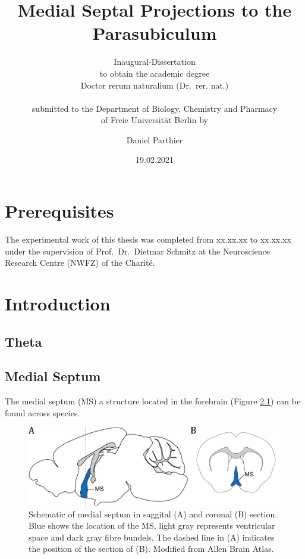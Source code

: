 \documentclass[
  12pt,
]{book}
\title{Medial Septal Projections to the Parasubiculum}
\subtitle{Inaugural-Dissertation\\
to obtain the academic degree\\
Doctor rerum naturalium (Dr.~rer. nat.)\\
~\\
submitted to the Department of Biology, Chemistry and Pharmacy\\
of Freie Universität Berlin by}
\author{Daniel Parthier}
\date{19.02.2021}
\begin{document}
\maketitle

{
\setcounter{tocdepth}{1}
\tableofcontents
}
\hypertarget{prerequisites}{%
\chapter{Prerequisites}\label{prerequisites}}

The experimental work of this thesis was completed from xx.xx.xx to xx.xx.xx under the supervision of Prof.~Dr.~Dietmar Schmitz at the Neuroscience Research Centre (NWFZ) of the Charité.

\hypertarget{intro}{%
\chapter{Introduction}\label{intro}}

\hypertarget{theta}{%
\section{Theta}\label{theta}}

\hypertarget{medial-septum}{%
\section{Medial Septum}\label{medial-septum}}

The medial septum (MS) a structure located in the forebrain (Figure \ref{fig:MS-Scheme}) can be found across species.

\begin{figure}[H]

{\centering \includegraphics{Figures/Schemes/MS_schematic} 

}

\caption{Schematic of medial septum in saggital (A) and coronal (B) section. Blue shows the location of the MS, light gray represents ventricular space and dark gray fibre bundels. The dashed line in (A) indicates the position of the section of (B). Modified from Allen Brain Atlas.}\label{fig:MS-Scheme}
\end{figure}
\end{document}
